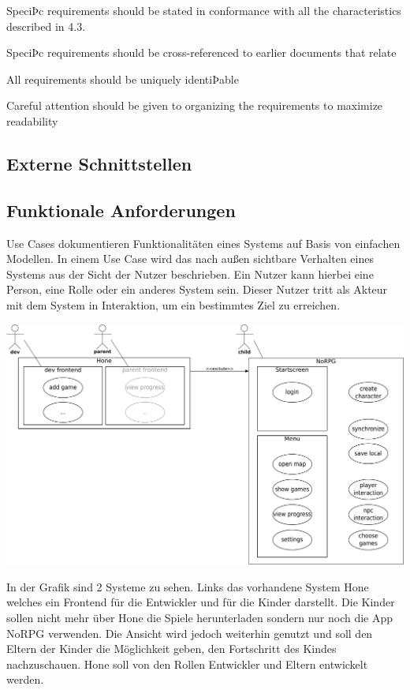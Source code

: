 	SpeciÞc requirements should be stated in conformance with all the characteristics described in 4.3.
	
	SpeciÞc requirements should be cross-referenced to earlier documents that relate
	
	All requirements should be uniquely identiÞable
	
	Careful attention should be given to organizing the requirements to maximize readability
	
	\subsection{Externe Schnittstellen}

	\subsection{Funktionale Anforderungen}
		Use Cases dokumentieren Funktionalitäten eines Systems auf Basis von einfachen Modellen. In einem Use Case wird das nach außen sichtbare Verhalten eines Systems aus der Sicht der Nutzer beschrieben. Ein Nutzer kann hierbei eine Person, eine Rolle oder ein anderes System sein. Dieser Nutzer tritt als Akteur mit dem System in Interaktion, um ein bestimmtes Ziel zu erreichen.
	
		\begin{center}
			\includegraphics[width=\textwidth]{pics/OUCD.pdf}
		\end{center}
	
		In der Grafik sind 2 Systeme zu sehen. Links das vorhandene System Hone welches ein Frontend für die Entwickler und für die Kinder darstellt. Die Kinder sollen nicht mehr über Hone die Spiele herunterladen sondern nur noch die App NoRPG verwenden. Die Ansicht wird jedoch weiterhin genutzt und soll den Eltern der Kinder die Möglichkeit geben, den Fortschritt des Kindes nachzuschauen. Hone soll von den Rollen Entwickler und Eltern entwickelt werden.
	
